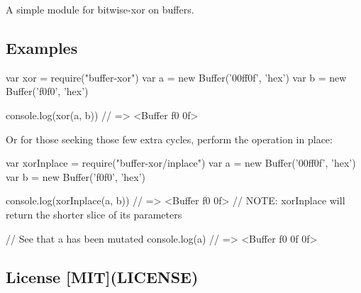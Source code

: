 \href{http://travis-ci.org/crypto-browserify/buffer-xor}{\tt } \href{https://www.npmjs.org/package/buffer-xor}{\tt }

\href{https://github.com/feross/standard}{\tt }

A simple module for bitwise-\/xor on buffers.

\subsection*{Examples}


\begin{DoxyCode}
var xor = require("buffer-xor")
var a = new Buffer('00ff0f', 'hex')
var b = new Buffer('f0f0', 'hex')

console.log(xor(a, b))
// => <Buffer f0 0f>
\end{DoxyCode}


Or for those seeking those few extra cycles, perform the operation in place\+:


\begin{DoxyCode}
var xorInplace = require("buffer-xor/inplace")
var a = new Buffer('00ff0f', 'hex')
var b = new Buffer('f0f0', 'hex')

console.log(xorInplace(a, b))
// => <Buffer f0 0f>
// NOTE: xorInplace will return the shorter slice of its parameters

// See that a has been mutated
console.log(a)
// => <Buffer f0 0f 0f>
\end{DoxyCode}


\subsection*{License \mbox{[}M\+IT\mbox{]}(L\+I\+C\+E\+N\+SE)}